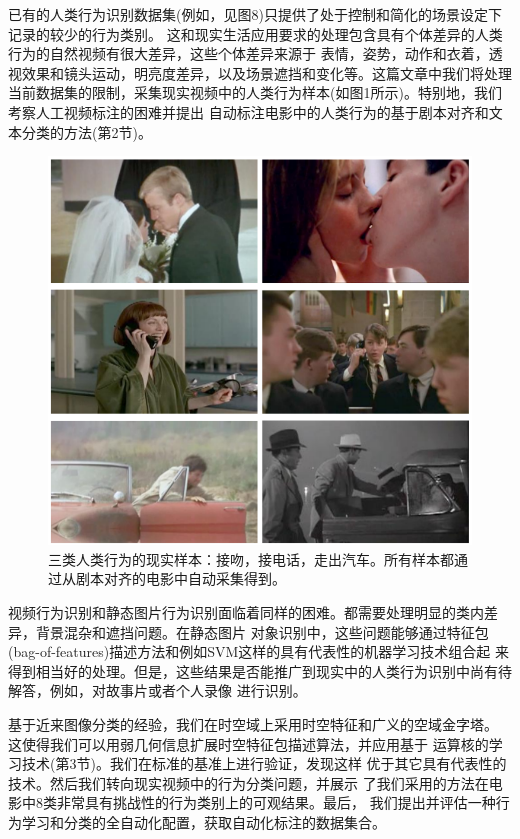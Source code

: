 \documentclass[10pt,twocolumn,letterpaper]{article}
\begin{document}
已有的人类行为识别数据集(例如\cite{15}，见图8)只提供了处于控制和简化的场景设定下记录的较少的行为类别。
这和现实生活应用要求的处理包含具有个体差异的人类行为的自然视频有很大差异，这些个体差异来源于
表情，姿势，动作和衣着，透视效果和镜头运动，明亮度差异，以及场景遮挡和变化等。这篇文章中我们将处理
当前数据集的限制，采集现实视频中的人类行为样本(如图1所示)。特别地，我们考察人工视频标注的困难并提出
自动标注电影中的人类行为的基于剧本对齐和文本分类的方法(第2节)。

\begin{figure}[t]
\begin{center}
   \includegraphics[width=1.0\linewidth]{fig1.png}
\end{center}
   \caption{
		   三类人类行为的现实样本：接吻，接电话，走出汽车。所有样本都通过从剧本对齐的电影中自动采集得到。
   }
\end{figure}

视频行为识别和静态图片行为识别面临着同样的困难。都需要处理明显的类内差异，背景混杂和遮挡问题。在静态图片
对象识别中，这些问题能够通过特征包(bag-of-features)描述方法\cite{17}和例如SVM这样的具有代表性的机器学习技术组合起
来得到相当好的处理。但是，这些结果是否能推广到现实中的人类行为识别中尚有待解答，例如，对故事片或者个人录像
进行识别。

基于近来图像分类的经验，我们在时空域上采用时空特征和广义的空域金字塔。
这使得我们可以用弱几何信息扩展时空特征包描述算法，并应用基于
运算核的学习技术(第3节)。我们在标准的基准\cite{15}上进行验证，发现这样
优于其它具有代表性的技术。然后我们转向现实视频中的行为分类问题，并展示
了我们采用的方法在电影中8类非常具有挑战性的行为类别上的可观结果。最后，
我们提出并评估一种行为学习和分类的全自动化配置，获取自动化标注的数据集合。
\end{document}
